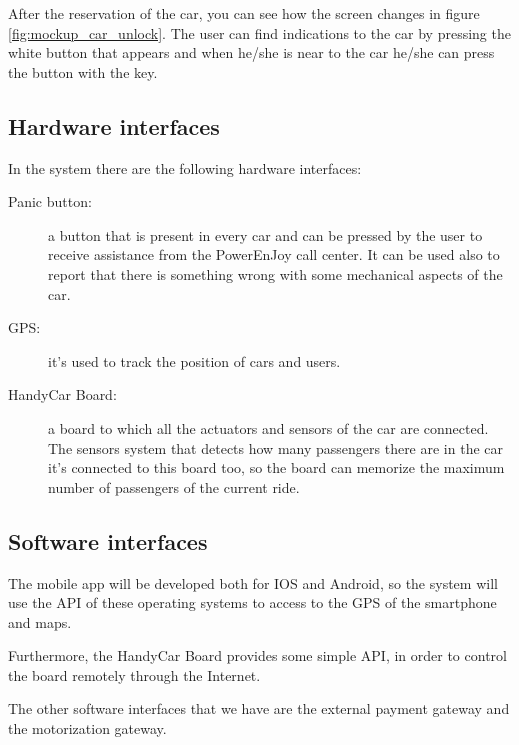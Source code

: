 After the reservation of the car, you can see how the screen changes in figure \ref{fig:mockup_car_unlock}. The user can find indications to the car by pressing the white button that appears and when he/she is near to the car he/she can press the button with the key.

\subsection{Hardware interfaces}
In the system there are the following hardware interfaces:
\begin{description}
	\item [Panic button:] a button that is present in every car and can be pressed by the user to receive assistance from the PowerEnJoy call center. It can be used also to report that there is something wrong with some mechanical aspects of the car.
	\item [GPS:] it's used to track the position of cars and users.
	\item [HandyCar Board:] a board to which all the actuators and sensors of the car are connected. The sensors system that detects how many passengers there are in the car it's connected to this board too, so the board can memorize the maximum number of passengers of the current ride.
\end{description}

\subsection{Software interfaces}
The mobile app will be developed both for IOS and Android, so the system will use the API of these operating systems to access to the GPS of the smartphone and maps.

Furthermore, the HandyCar Board provides some simple API, in order to control the board remotely through the Internet.

The other software interfaces that we have are the external payment	gateway and the motorization gateway.




